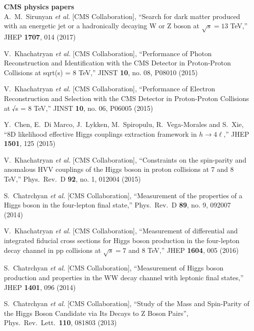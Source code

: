         {\bf CMS physics papers}
        \\    

  A.~M.~Sirunyan {\it et al.} [CMS Collaboration],
  ``Search for dark matter produced with an energetic jet or a hadronically decaying W or Z boson at $ \sqrt{s}=13 $ TeV,''
  JHEP {\bf 1707}, 014 (2017)

  V.~Khachatryan {\it et al.} [CMS Collaboration],
  ``Performance of Photon Reconstruction and Identification with the CMS Detector in Proton-Proton Collisions at sqrt(s) = 8 TeV,''
  JINST {\bf 10}, no. 08, P08010 (2015)

  V.~Khachatryan {\it et al.} [CMS Collaboration],
  ``Performance of Electron Reconstruction and Selection with the CMS Detector in Proton-Proton Collisions at √s = 8  TeV,''
  JINST {\bf 10}, no. 06, P06005 (2015)

  Y.~Chen, E.~Di Marco, J.~Lykken, M.~Spiropulu, R.~Vega-Morales and S.~Xie,
  ``8D likelihood effective Higgs couplings extraction framework in $h \to 4\ell$,''
  JHEP {\bf 1501}, 125 (2015)

  V.~Khachatryan {\it et al.} [CMS Collaboration],
  ``Constraints on the spin-parity and anomalous HVV couplings of the Higgs boson in proton collisions at 7 and 8 TeV,''
  Phys.\ Rev.\ D {\bf 92}, no. 1, 012004 (2015)

  S.~Chatrchyan {\it et al.} [CMS Collaboration],
  ``Measurement of the properties of a Higgs boson in the four-lepton final state,''
  Phys.\ Rev.\ D {\bf 89}, no. 9, 092007 (2014)

  V.~Khachatryan {\it et al.} [CMS Collaboration],
  ``Measurement of differential and integrated fiducial cross sections for Higgs boson production in the four-lepton decay channel in pp collisions at $ \sqrt{s}=7 $ and 8 TeV,''
  JHEP {\bf 1604}, 005 (2016)

  S.~Chatrchyan {\it et al.} [CMS Collaboration],
  ``Measurement of Higgs boson production and properties in the WW decay channel with leptonic final states,''
  JHEP {\bf 1401}, 096 (2014)

  S.~Chatrchyan {\it et al.}  [CMS Collaboration],
  ``Study of the Mass and Spin-Parity of the Higgs Boson Candidate via Its Decays to Z Boson Pairs'',
  Phys.\ Rev.\ Lett.\  {\bf 110}, 081803 (2013)

